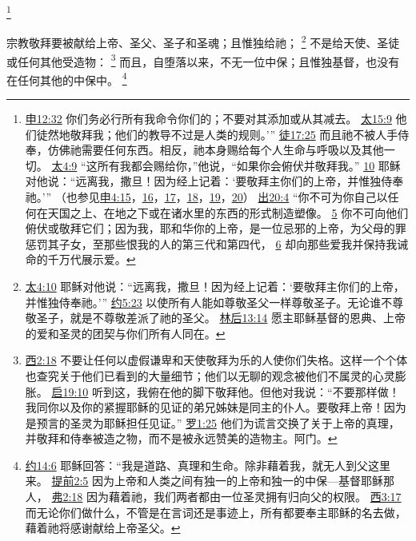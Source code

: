 \documentclass[12pt, a4paper, oneside]{ctexart}
\newcounter{parnum}[section]
\newcommand{\N}{%
   \noindent\refstepcounter{parnum}%
    \makebox[\parindent][l]{\textbf{\arabic{parnum}.}}}
\begin{document}
	\footnote {
		\href{https://biblehub.com/deuteronomy/12-32.htm}{申12:32} 你们务必行所有我命令你们的；不要对其添加或从其减去。
		\href{https://biblehub.com/matthew/15-9.htm}{太15:9} 他们徒然地敬拜我；他们的教导不过是人类的规则。’”
		\href{https://biblehub.com/acts/17-25.htm}{徒17:25} 而且祂不被人手侍奉，仿佛祂需要任何东西。相反，祂本身赐给每个人生命与呼吸以及其他一切。
		\href{https://biblehub.com/matthew/4-9.htm}{太4:9} “这所有我都会赐给你，”他说，“如果你会俯伏并敬拜我。”
		\href{https://biblehub.com/matthew/4-10.htm}{10} 耶稣对他说：“远离我，撒旦！因为经上记着：‘要敬拜主你们的上帝，并惟独侍奉祂。’”
		（也参见\href{https://biblehub.com/deuteronomy/4-15.htm}{申4:15}，\href{https://biblehub.com/deuteronomy/4-16.htm}{16}，\href{https://biblehub.com/deuteronomy/4-17.htm}{17}，\href{https://biblehub.com/deuteronomy/4-18.htm}{18}，\href{https://biblehub.com/deuteronomy/4-19.htm}{19}，\href{https://biblehub.com/deuteronomy/4-20.htm}{20}）
		\href{https://biblehub.com/exodus/20-4.htm}{出20:4} “你不可为你自己以任何在天国之上、在地之下或在诸水里的东西的形式制造塑像。
		\href{https://biblehub.com/exodus/20-5.htm}{5} 你不可向他们俯伏或敬拜它们；因为我，耶和华你的上帝，是一位忌邪的上帝，为父母的罪惩罚其子女，至那些恨我的人的第三代和第四代，
		\href{https://biblehub.com/exodus/20-6.htm}{6} 却向那些爱我并保持我诫命的千万代展示爱。
	}

\N 宗教敬拜要被献给上帝、圣父、圣子和圣魂；且惟独给祂；
	\footnote {
		\href{https://biblehub.com/matthew/4-10.htm}{太4:10} 耶稣对他说：“远离我，撒旦！因为经上记着：‘要敬拜主你们的上帝，并惟独侍奉祂。’”
		\href{https://biblehub.com/john/5-23.htm}{约5:23} 以使所有人能如尊敬圣父一样尊敬圣子。无论谁不尊敬圣子，就是不尊敬差派了祂的圣父。
		\href{https://biblehub.com/2_corinthians/13-14.htm}{林后13:14} 愿主耶稣基督的恩典、上帝的爱和圣灵的团契与你们所有人同在。
	}
	不是给天使、圣徒或任何其他受造物：
	\footnote {
		\href{https://biblehub.com/colossians/2-18.htm}{西2:18} 不要让任何以虚假谦卑和天使敬拜为乐的人使你们失格。这样一个个体也查究关于他们已看到的大量细节；他们以无聊的观念被他们不属灵的心灵膨胀。
		\href{https://biblehub.com/revelation/19-10.htm}{启19:10} 听到这，我俯在他的脚下敬拜他。但他对我说：“不要那样做！我同你以及你的紧握耶稣的见证的弟兄姊妹是同主的仆人。要敬拜上帝！因为是预言的圣灵为耶稣担任见证。”
		\href{https://biblehub.com/romans/1-25.htm}{罗1:25} 他们为谎言交换了关于上帝的真理，并敬拜和侍奉被造之物，而不是被永远赞美的造物主。阿门。
	}
	而且，自堕落以来，不无一位中保；且惟独基督，也没有在任何其他的中保中。
	\footnote {
		\href{https://biblehub.com/john/14-6.htm}{约14:6} 耶稣回答：“我是道路、真理和生命。除非藉着我，就无人到父这里来。
		\href{https://biblehub.com/1_timothy/2-5.htm}{提前2:5} 因为上帝和人类之间有独一的上帝和独一的中保---基督耶稣那人，
		\href{https://biblehub.com/ephesians/2-18.htm}{弗2:18} 因为藉着祂，我们两者都由一位圣灵拥有归向父的权限。
		\href{https://biblehub.com/colossians/3-17.htm}{西3:17} 而无论你们做什么，不管是在言词还是事迹上，所有都要奉主耶稣的名去做，藉着祂将感谢献给上帝圣父。
	}
\end{document}
